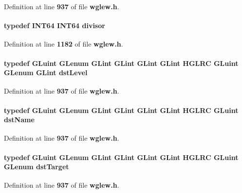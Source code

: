 Definition at line {\bf 937} of file {\bf wglew.\+h}.

\paragraph[{divisor}]{\setlength{\rightskip}{0pt plus 5cm}typedef {\bf I\+N\+T64} {\bf I\+N\+T64} {\bf divisor}}\label{wglew_8h_a3c52243718c17289294081550b5a758a}


Definition at line {\bf 1182} of file {\bf wglew.\+h}.

\paragraph[{dst\+Level}]{\setlength{\rightskip}{0pt plus 5cm}typedef {\bf G\+Luint} {\bf G\+Lenum} {\bf G\+Lint} {\bf G\+Lint} {\bf G\+Lint} {\bf G\+Lint} {\bf H\+G\+L\+RC} {\bf G\+Luint} {\bf G\+Lenum} {\bf G\+Lint} {\bf dst\+Level}}\label{wglew_8h_a5ddced50c53f700a1a4722d9871d2c1e}


Definition at line {\bf 937} of file {\bf wglew.\+h}.

\paragraph[{dst\+Name}]{\setlength{\rightskip}{0pt plus 5cm}typedef {\bf G\+Luint} {\bf G\+Lenum} {\bf G\+Lint} {\bf G\+Lint} {\bf G\+Lint} {\bf G\+Lint} {\bf H\+G\+L\+RC} {\bf G\+Luint} {\bf dst\+Name}}\label{wglew_8h_a6c7a086a4645803ec6623e4bfdff4bd9}


Definition at line {\bf 937} of file {\bf wglew.\+h}.

\paragraph[{dst\+Target}]{\setlength{\rightskip}{0pt plus 5cm}typedef {\bf G\+Luint} {\bf G\+Lenum} {\bf G\+Lint} {\bf G\+Lint} {\bf G\+Lint} {\bf G\+Lint} {\bf H\+G\+L\+RC} {\bf G\+Luint} {\bf G\+Lenum} {\bf dst\+Target}}\label{wglew_8h_a26fa3f71f13bffcc33a82733ea4c29dd}


Definition at line {\bf 937} of file {\bf wglew.\+h}.

